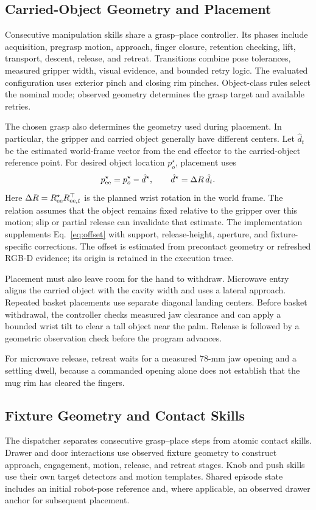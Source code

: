 \documentclass[letterpaper,10pt,conference]{ieeeconf}
\begin{document}
\subsection{Carried-Object Geometry and Placement}
\label{sec:placement}
Consecutive manipulation skills share a grasp--place controller. Its phases
include acquisition, pregrasp motion, approach, finger closure, retention
checking, lift, transport, descent, release, and retreat. Transitions combine
pose tolerances, measured gripper width, visual evidence, and bounded retry
logic. The evaluated configuration uses exterior pinch and closing rim
pinches. Object-class rules select the nominal mode; observed geometry
determines the grasp target and available retries.

The chosen grasp also determines the geometry used during placement.
In particular, the gripper and carried object generally have different
centers. Let $\hat d_t$ be the estimated world-frame vector from the end
effector to the carried-object reference point. For desired object location
$p_o^\star$, placement uses
\begin{equation}
 p_{\rm ee}^\star=p_o^\star-\hat d^\star,\qquad
 \hat d^\star=\Delta R\,\hat d_t.
 \label{eq:offset}
\end{equation}
Here $\Delta R=R_{\rm ee}^\star R_{{\rm ee},t}^{\top}$ is the planned wrist
rotation in the world frame. The relation assumes that the object remains
fixed relative to the gripper over this motion; slip or partial release can
invalidate that estimate. The implementation supplements Eq.~\eqref{eq:offset}
with support, release-height, aperture, and fixture-specific corrections.
The offset is estimated from precontact geometry or refreshed RGB-D evidence;
its origin is retained in the execution trace.

Placement must also leave room for the hand to withdraw. Microwave entry
aligns the carried object with the cavity width and uses a lateral approach.
Repeated basket placements use separate diagonal landing centers. Before
basket withdrawal, the controller checks measured jaw clearance and can
apply a bounded wrist tilt to clear a tall object near the palm. Release is
followed by a geometric observation check before the program advances.

For microwave release, retreat waits for a measured 78-mm jaw opening and
a settling dwell, because a commanded opening alone does not establish
that the mug rim has cleared the fingers.

\subsection{Fixture Geometry and Contact Skills}
The dispatcher separates consecutive grasp--place steps from atomic contact
skills. Drawer and door interactions use observed fixture geometry to
construct approach, engagement, motion, release, and retreat stages.
Knob and push skills use their own target detectors and motion templates.
Shared episode state includes an initial robot-pose reference and, where
applicable, an observed drawer anchor for subsequent placement.
\end{document}

